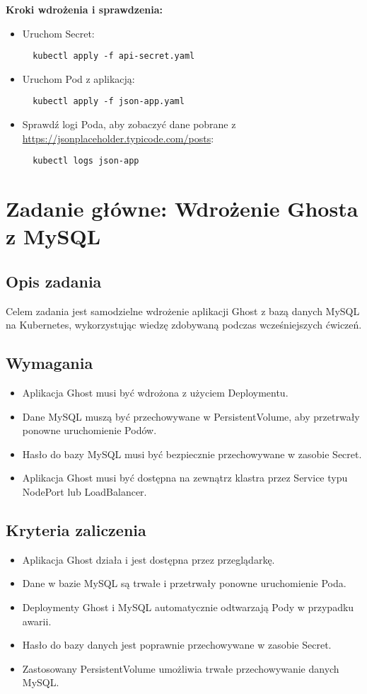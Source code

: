 \documentclass{article}
\begin{document}
\textbf{Kroki wdrożenia i sprawdzenia:}
\begin{itemize}
  \item Uruchom Secret:
  \begin{lstlisting}
  kubectl apply -f api-secret.yaml
  \end{lstlisting}
  \item Uruchom Pod z aplikacją:
  \begin{lstlisting}
  kubectl apply -f json-app.yaml
  \end{lstlisting}
  \item Sprawdź logi Poda, aby zobaczyć dane pobrane z \url{https://jsonplaceholder.typicode.com/posts}:
  \begin{lstlisting}
  kubectl logs json-app
  \end{lstlisting}
\end{itemize}

\section{Zadanie główne: Wdrożenie Ghosta z MySQL}
\subsection{Opis zadania}
Celem zadania jest samodzielne wdrożenie aplikacji Ghost z bazą danych MySQL na Kubernetes, wykorzystując wiedzę zdobywaną podczas wcześniejszych ćwiczeń.

\subsection{Wymagania}
\begin{itemize}
  \item Aplikacja Ghost musi być wdrożona z użyciem Deploymentu.
  \item Dane MySQL muszą być przechowywane w PersistentVolume, aby przetrwały ponowne uruchomienie Podów.
  \item Hasło do bazy MySQL musi być bezpiecznie przechowywane w zasobie Secret.
  \item Aplikacja Ghost musi być dostępna na zewnątrz klastra przez Service typu NodePort lub LoadBalancer.
\end{itemize}

\subsection{Kryteria zaliczenia}
\begin{itemize}
  \item Aplikacja Ghost działa i jest dostępna przez przeglądarkę.
  \item Dane w bazie MySQL są trwałe i przetrwały ponowne uruchomienie Poda.
  \item Deploymenty Ghost i MySQL automatycznie odtwarzają Pody w przypadku awarii.
  \item Hasło do bazy danych jest poprawnie przechowywane w zasobie Secret.
  \item Zastosowany PersistentVolume umożliwia trwałe przechowywanie danych MySQL.
\end{itemize}
\end{document}
